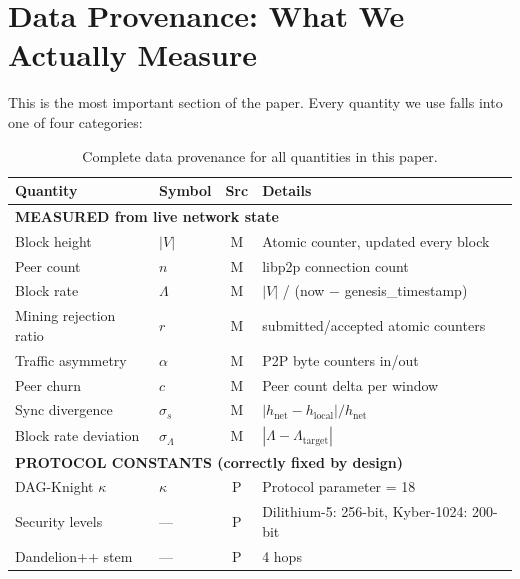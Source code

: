 \documentclass[11pt,a4paper]{article}
\begin{document}
\section{Data Provenance: What We Actually Measure}
\label{sec:provenance}

This is the most important section of the paper. Every quantity we use falls into one of four categories:

\begin{table}[H]
\centering
\caption{Complete data provenance for all quantities in this paper.}
\label{tab:provenance}
\small
\begin{tabular}{@{}p{3.5cm}lcp{5cm}@{}}
\toprule
\textbf{Quantity} & \textbf{Symbol} & \textbf{Src} & \textbf{Details} \\
\midrule
\multicolumn{4}{l}{\textbf{\textcolor{measured}{MEASURED from live network state}}} \\
\midrule
Block height & $|V|$ & \textcolor{measured}{M} & Atomic counter, updated every block \\
Peer count & $n$ & \textcolor{measured}{M} & libp2p connection count \\
Block rate & $\Lambda$ & \textcolor{measured}{M} & $|V|$ / (now $-$ genesis\_timestamp) \\
Mining rejection ratio & $r$ & \textcolor{measured}{M} & submitted/accepted atomic counters \\
Traffic asymmetry & $\alpha$ & \textcolor{measured}{M} & P2P byte counters in/out \\
Peer churn & $c$ & \textcolor{measured}{M} & Peer count delta per window \\
Sync divergence & $\sigma_s$ & \textcolor{measured}{M} & $|h_{\text{net}} - h_{\text{local}}|/h_{\text{net}}$ \\
Block rate deviation & $\sigma_\Lambda$ & \textcolor{measured}{M} & $|\Lambda - \Lambda_{\text{target}}|$ \\
\midrule
\multicolumn{4}{l}{\textbf{\textcolor{sectionblue}{PROTOCOL CONSTANTS (correctly fixed by design)}}} \\
\midrule
DAG-Knight $\kappa$ & $\kappa$ & \textcolor{sectionblue}{P} & Protocol parameter = 18 \\
Security levels & --- & \textcolor{sectionblue}{P} & Dilithium-5: 256-bit, Kyber-1024: 200-bit \\
Dandelion++ stem & --- & \textcolor{sectionblue}{P} & 4 hops \\

\end{tabular}
\end{table}
\end{document}
